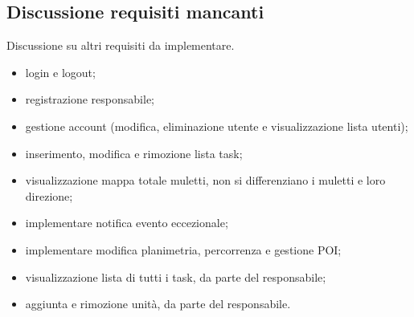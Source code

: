 \subsection{Discussione requisiti mancanti}
Discussione su altri requisiti da implementare.
\begin{itemize}
	\item login e logout;
	\item registrazione responsabile;
	\item gestione account (modifica, eliminazione utente e visualizzazione lista utenti);
	\item inserimento, modifica e rimozione lista task;
	\item visualizzazione mappa totale muletti, non si differenziano i muletti e loro direzione;
	\item implementare notifica evento eccezionale;
	\item implementare modifica planimetria, percorrenza e gestione POI;
	\item visualizzazione lista di tutti i task, da parte del responsabile;
	\item aggiunta e rimozione unità, da parte del responsabile.	
\end{itemize}
